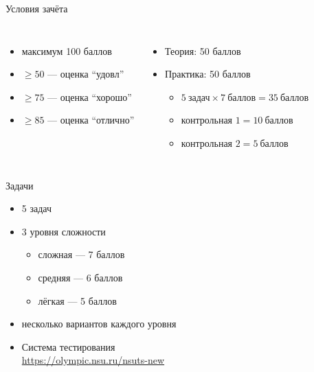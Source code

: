 \documentclass[aspectratio=169,14pt]{beamer}
\begin{document}
    \begin{frame}{Условия зачёта}
        \begin{columns}
                \begin{itemize}
                    \item максимум 100 баллов
                    \item $\geqslant 50$ --- оценка ``удовл''
                    \item $\geqslant 75$ --- оценка ``хорошо''
                    \item $\geqslant 85$ --- оценка ``отлично''
                \end{itemize}
                \begin{itemize}
                    \item Теория: 50 баллов
                    \item Практика: 50 баллов
                        \begin{itemize}
                            \item $5~\text{задач} \times 7~\text{баллов} = 35~\text{баллов}$
                            \item $\text{контрольная 1} = 10~\text{баллов}$
                            \item $\text{контрольная 2} = 5~\text{баллов}$
                        \end{itemize}
                \end{itemize}
        \end{columns}
    \end{frame}

    \begin{frame}{Задачи}
        \begin{itemize}
            \item 5 задач
            \item 3 уровня сложности
                \begin{itemize}
                    \item сложная --- 7 баллов
                    \item средняя --- 6 баллов
                    \item лёгкая --- 5 баллов
                \end{itemize}
            \item несколько вариантов каждого уровня
            \item Система тестирования \\
                \url{https://olympic.nsu.ru/nsuts-new}
        \end{itemize}
    \end{frame}
\end{document}

